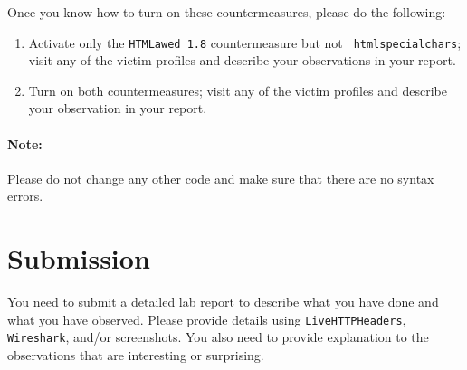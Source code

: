 Once you know how to turn on these countermeasures, please do the
following:
\begin{enumerate}

\item Activate only the {\tt HTMLawed 1.8} countermeasure but not {\tt
htmlspecialchars}; visit any of the victim profiles and describe your
observations in your report. 

\item Turn on both countermeasures; visit any of the victim profiles and 
describe your observation in your report. 



\end{enumerate}


\paragraph{Note:} Please do not change any other code and make sure that there are no syntax
errors.




\section{Submission}

You need to submit a detailed lab report to describe what you have
done and what you have observed. Please provide details using  
{\tt LiveHTTPHeaders},  {\tt Wireshark}, and/or screenshots.
You also need to provide explanation
to the observations that are interesting or surprising.



